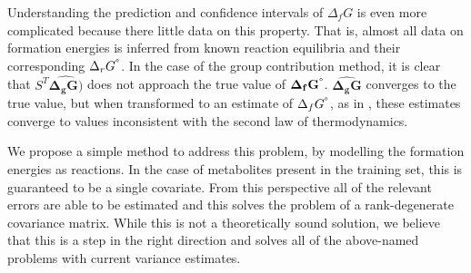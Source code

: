 \documentclass[10pt,letterpaper]{article}
\newcommand{\dgf}{\Delta_fG}
\newcommand{\sdgf}{\Delta_fG^{\degree}}
\newcommand{\sdgr}{\Delta_rG^{\degree}}
\newcommand{\sdgg}{\Delta_gG}
\newcommand{\bsdgg}{\mathbf{\sdgg}}
\newcommand{\bsdgf}{\mathbf{\sdgf}}
\begin{document}

Understanding the prediction and confidence intervals of $\dgf$ is even more complicated because there little data on this property.
That is, almost all data on formation energies is inferred from known reaction equilibria and their corresponding $\sdgr$.
In the case of the group contribution method, it is clear that $S^T\hat{\bsdgg)}$ does not approach the true value of $\bsdgf$.
$\hat{\bsdgg}$ converges to the true value, but when transformed to an estimate of $\sdgf$, as in \cite{noor_2013_equilibrator}, these estimates converge to values inconsistent with the second law of thermodynamics.




We propose a simple method to address this problem, by modelling the formation energies as reactions.
In the case of metabolites present in the training set, this is guaranteed to be a single covariate.
From this perspective all of the relevant errors are able to be estimated and this solves the problem of a rank-degenerate covariance matrix.
While this is not a theoretically sound solution, we believe that this is a step in the right direction and solves all of the above-named problems with current variance estimates.





\end{document}
